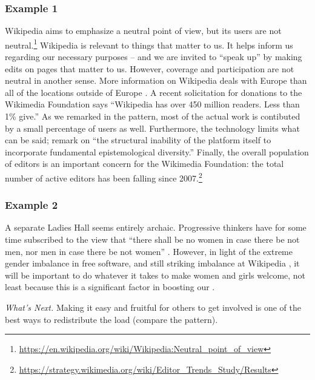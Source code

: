 \subsubsection*{Example 1}
Wikipedia aims to emphasize a neutral point of view, but its users are
not neutral.\footnote{\url{https://en.wikipedia.org/wiki/Wikipedia:Neutral_point_of_view}}
Wikipedia is relevant to things that matter to us.  It
helps inform us regarding our necessary purposes -- and we are invited
to ``speak up'' by making edits on pages that matter to us.  However,
coverage and participation are not neutral in another sense.
More information on Wikipedia deals with Europe than
all of the locations outside of Europe \cite{graham2014uneven}.
A recent solicitation for donations to the Wikimedia Foundation
says ``Wikipedia has over 450 million readers.  Less than 1\% give.''
%
As we remarked in the  pattern, most of the
actual work is contibuted by a small percentage of users as well.
%
Furthermore, the technology limits what can be said; 
\cite{graham2014uneven} remark on
``the structural inability of the platform itself to incorporate fundamental epistemological diversity.''
%
Finally, the overall population of editors is an important concern for
the Wikimedia Foundation: the total number of active editors has been
falling since
2007.\footnote{\url{https://strategy.wikimedia.org/wiki/Editor_Trends_Study/Results}}

\subsubsection*{Example 2}
A separate Ladies Hall seems entirely archaic.  Progressive thinkers have for
some time subscribed to the view that ``there shall be no women in
case there be not men, nor men in case there be not women''
\cite[Chapter 1.LII]{rabelais1894gargantua}.  However, in light of the
extreme gender imbalance in free software, and still striking
imbalance at Wikipedia \cite{gender,FM4291}, it will be important to
do whatever it takes to make women and girls welcome, not least
because this is a significant factor in boosting our
.


\begin{framed}
\noindent 
\emph{What's Next.}  Making it easy and fruitful for others to get involved is one of the best ways to redistribute the load (compare the
 pattern).
\end{framed}



  
